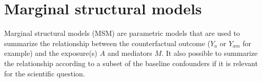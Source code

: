 \documentclass[
]{book}
\newenvironment{Shaded}{\begin{snugshade}}{\end{snugshade}}
\newcommand{\CommentTok}[1]{\textcolor[rgb]{0.56,0.35,0.01}{\textit{#1}}}
\newcommand{\DecValTok}[1]{\textcolor[rgb]{0.00,0.00,0.81}{#1}}
\newcommand{\FunctionTok}[1]{\textcolor[rgb]{0.13,0.29,0.53}{\textbf{#1}}}
\newcommand{\NormalTok}[1]{#1}
\newcommand{\OtherTok}[1]{\textcolor[rgb]{0.56,0.35,0.01}{#1}}
\newcommand{\SpecialCharTok}[1]{\textcolor[rgb]{0.81,0.36,0.00}{\textbf{#1}}}
\begin{document}
\begin{Shaded}
\end{Shaded}

\chapter{Marginal structural models}\label{msm_chapter}

Marginal structural models (MSM) are parametric models that are used to summarize the relationship between the counterfactual outcome (\(Y_a\) or \(Y_{am}\) for example) and the exposure(s) \(A\) and mediators \(M\). It also possible to summarize the relationship according to a subset of the baseline confounders if it is relevant for the scientific question.
\end{document}
